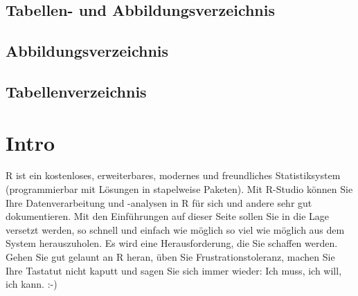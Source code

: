 \documentclass[twoside, pagesize, fontsize=11pt, dvipsnames]{scrreport}
\begin{document}
\tableofcontents

\clearpage

\section*{Tabellen- und Abbildungsverzeichnis}


\section*{Abbildungsverzeichnis}
\label{sec:Abbildungsverzeichnis}

\listoffigures

\section*{Tabellenverzeichnis}
\label{sec:tabellenverzeichnis}

\listoftables

\cleardoublepage





\hypertarget{intro}{%
\chapter{Intro}\label{intro}}

R ist ein kostenloses, erweiterbares, modernes und freundliches
Statistiksystem (programmierbar mit Lösungen in stapelweise Paketen).
Mit R-Studio können Sie Ihre Datenverarbeitung und -analysen in R für
sich und andere sehr gut dokumentieren. Mit den Einführungen auf dieser
Seite sollen Sie in die Lage versetzt werden, so schnell und einfach wie
möglich so viel wie möglich aus dem System herauszuholen. Es wird eine
Herausforderung, die Sie schaffen werden. Gehen Sie gut gelaunt an R
heran, üben Sie Frustrationstoleranz, machen Sie Ihre Tastatut nicht
kaputt und sagen Sie sich immer wieder: Ich muss, ich will, ich kann.
:-)
\end{document}
